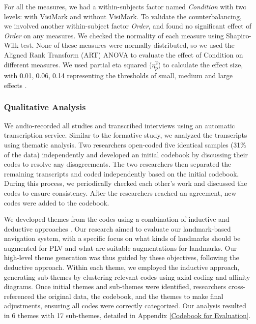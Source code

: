 For all the measures, we had a within-subjects factor named \textit{Condition} with two levels: with VisiMark and without VisiMark. To validate the counterbalancing, we involved another within-subject factor \textit{Order}, and found no significant effect of \textit{Order} on any measures. We checked the normality of each measure using Shapiro-Wilk test. None of these measures were normally distributed, so we used the Aligned Rank Transform (ART) ANOVA to evaluate the effect of Condition on different measures. We used partial eta squared ($\eta ^2_p$) to calculate the effect size, with 0.01, 0.06, 0.14 representing the thresholds of small, medium and large effects \cite{cohen2013statistical,wang2024gazeprompt}.

\subsubsection{Qualitative Analysis}
We audio-recorded all studies and transcribed interviews using an automatic transcription service. Similar to the formative study, we analyzed the transcripts using thematic analysis. Two researchers open-coded five identical samples (31\% of the data) independently and developed an initial codebook by discussing their codes to resolve any disagreements. The two researchers then separated the remaining transcripts and coded independently based on the initial codebook. During this process, we periodically checked each other's work and discussed the codes to ensure consistency. After the researchers reached an agreement, new codes were added to the codebook.

We developed themes from the codes using a combination of inductive and deductive approaches \cite{braun2006using}. Our research aimed to evaluate our landmark-based navigation system, with a specific focus on what kinds of landmarks should be augmented for PLV and what are suitable augmentations for landmarks. Our high-level theme generation was thus guided by these objectives, following the deductive approach. Within each theme, we employed the inductive approach, generating sub-themes by clustering relevant codes using axial coding and affinity diagrams. Once initial themes and sub-themes were identified, researchers cross-referenced the original data, the codebook, and the themes to make final adjustments, ensuring all codes were correctly categorized. Our analysis resulted in 6 themes with 17 sub-themes, detailed in Appendix \ref{Codebook for Evaluation}.%